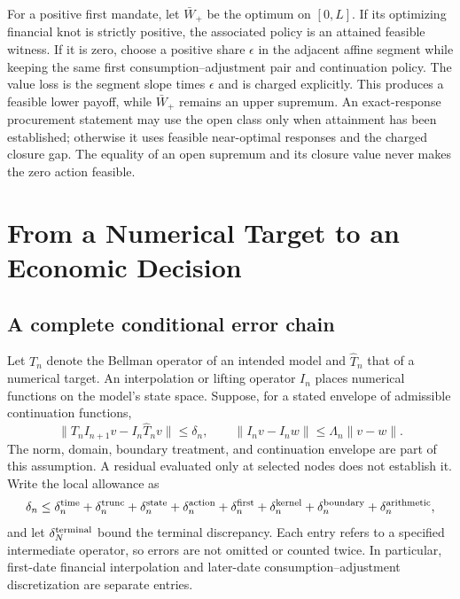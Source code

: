 For a positive first mandate, let $\bar W_+$ be the optimum on $[0,L]$. If its optimizing financial knot is strictly positive, the associated policy is an attained feasible witness. If it is zero, choose a positive share $\epsilon$ in the adjacent affine segment while keeping the same first consumption--adjustment pair and continuation policy. The value loss is the segment slope times $\epsilon$ and is charged explicitly. This produces a feasible lower payoff, while $\bar W_+$ remains an upper supremum. An exact-response procurement statement may use the open class only when attainment has been established; otherwise it uses feasible near-optimal responses and the charged closure gap. The equality of an open supremum and its closure value never makes the zero action feasible.

\section{From a Numerical Target to an Economic Decision}
\label{sec:transfer}
\subsection{A complete conditional error chain}
Let $T_n$ denote the Bellman operator of an intended model and $\widehat T_n$ that of a numerical target. An interpolation or lifting operator $I_n$ places numerical functions on the model's state space. Suppose, for a stated envelope of admissible continuation functions,
\begin{equation}
 \|T_n I_{n+1}v-I_n\widehat T_n v\|\leq\delta_n,
 \qquad \|I_n v-I_n w\|\leq\Lambda_n\|v-w\|.
 \label{eq:residual}
\end{equation}
The norm, domain, boundary treatment, and continuation envelope are part of this assumption. A residual evaluated only at selected nodes does not establish it. Write the local allowance as
\begin{equation}
 \delta_n\leq\delta_n^{\rm time}+\delta_n^{\rm trunc}
 +\delta_n^{\rm state}+\delta_n^{\rm action}
 +\delta_n^{\rm first}+\delta_n^{\rm kernel}
 +\delta_n^{\rm boundary}+\delta_n^{\rm arithmetic},
 \label{eq:budget}
\end{equation}
and let $\delta_N^{\rm terminal}$ bound the terminal discrepancy. Each entry refers to a specified intermediate operator, so errors are not omitted or counted twice. In particular, first-date financial interpolation and later-date consumption--adjustment discretization are separate entries.

